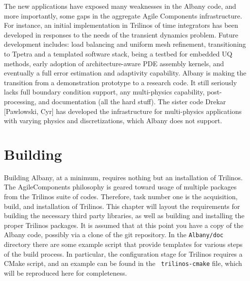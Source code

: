 \documentclass[pdf,12pt,report,strict]{SANDreport}
\theoremstyle{remark}
\begin{document}
The new applications have exposed many weaknesses in the Albany code,
and more importantly, some gaps in the aggregate Agile Components
infrastructure. For instance, an initial implementation in Trilinos of
time integrators has been developed in responses to the needs of the
transient dynamics problem. Future development includes: load
balancing and uniform mesh refinement, transitioning to Tpetra and a
templated software stack, being a testbed for embedded UQ methods,
early adoption of architecture-aware PDE assembly kernels, and
eventually a full error estimation and adaptivity capability. Albany
is making the transition from a demonstration prototype to a research
code. It still seriously lacks full boundary condition support, any
multi-physics capability, post-processing, and documentation (all the
hard stuff). The sister code Drekar [Pawlowski, Cyr] has developed the
infrastructure for multi-physics applications with varying physics and
discretizations, which Albany does not support.

\chapter{Building}
\label{build}

Building Albany, at a minimum, requires nothing but an installation of
Trilinos. The AgileComponents philosophy is geared toward usage of
multiple packages from the Trilinos suite of codes. Therefore, task
number one is the acquisition, build, and installation of
Trilinos. This chapter will layout the requirements for building the
necessary third party libraries, as well as building and installing
the proper Trilinos packages.  It is assumed that at this point you
have a copy of the Albany code, possibly via a clone of the git
repository. In the {\tt Albany/doc} directory there are some example
script that provide templates for various steps of the build
process. In particular, the configuration stage for Trilinos requires
a CMake script, and an example can be found in the {\tt
  trilinos-cmake} file, which will be reproduced here for
completeness.
\end{document}
